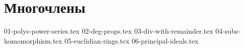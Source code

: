 \section{Многочлены}
{01-polys-power-series.tex}
{02-deg-props.tex}
{03-div-with-remainder.tex}
{04-subs-homomorphism.tex}
{05-euclidian-rings.tex}
{06-principal-ideals.tex}
